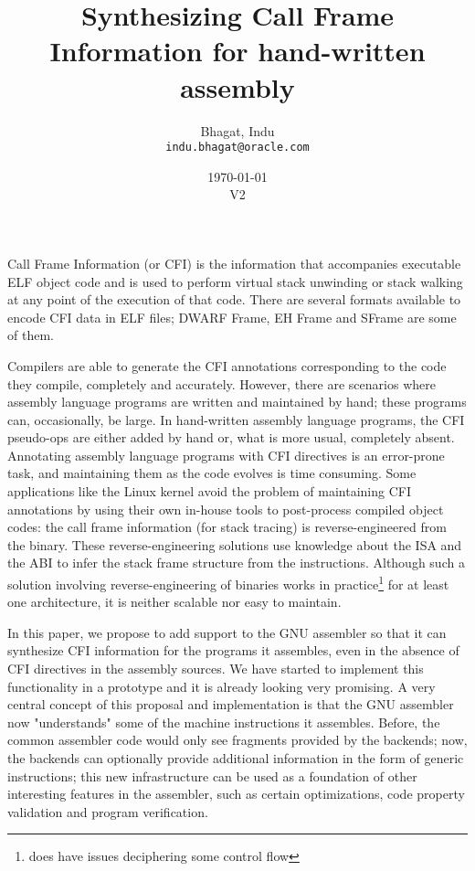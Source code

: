 \documentclass{article} \usepackage[a4paper, total={6in, 8in}]{geometry}
\title{Synthesizing Call Frame Information for hand-written assembly}
\date{\today \\ V2}
\author{Bhagat, Indu\\ \texttt{indu.bhagat@oracle.com} }
\begin{document}
\maketitle

\abstract Call Frame Information (or CFI) is the information that accompanies
executable ELF object code and is used to perform virtual stack unwinding or
stack walking at any point of the execution of that code.  There are several
formats available to encode CFI data in ELF files; DWARF Frame, EH Frame and
SFrame are some of them.

Compilers are able to generate the CFI annotations corresponding to the code
they compile, completely and accurately.  However, there are scenarios where
assembly language programs are written and maintained by hand; these programs
can, occasionally, be large.  In hand-written assembly language
programs, the CFI pseudo-ops are either added by hand or, what is more usual,
completely absent. Annotating assembly language programs with CFI directives
is an error-prone task, and maintaining them as the code evolves is time
consuming.  Some applications like the Linux kernel avoid the problem of
maintaining CFI annotations by using their own in-house tools to post-process
compiled object codes: the call frame information (for stack tracing) is
reverse-engineered from the binary.  These reverse-engineering solutions use
knowledge about the ISA and the ABI to infer the stack frame structure from the
instructions.  Although such a solution involving reverse-engineering of
binaries works in practice\footnote{does have issues deciphering some control
flow} for at least one architecture, it is neither scalable nor easy to
maintain.

In this paper, we propose to add support to the GNU assembler so that it can
synthesize CFI information for the programs it assembles, even in the absence
of CFI directives in the assembly sources.  We have started to implement this
functionality in a prototype and it is already looking very promising. A very
central concept of this proposal and implementation is that the GNU assembler
now "understands" some of the machine instructions it assembles.  Before, the
common assembler code would only see fragments provided by the backends; now,
the backends can optionally provide additional information in the form of
generic instructions; this new infrastructure can be used as a foundation of
other interesting features in the assembler, such as certain optimizations,
code property validation and program verification.
\end{document}
